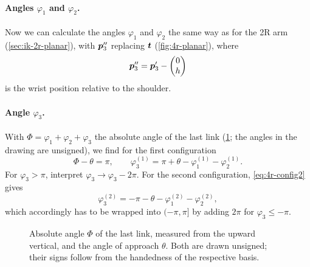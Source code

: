 \paragraph{Angles $\varphi_1$ and $\varphi_2$.}
Now we can calculate the angles $\varphi_1$ and $\varphi_2$ the same way
as for the 2R arm (\cref{sec:ik-2r-planar}), with $\bm{p}_3''$
replacing $\bm{t}$ (\cref{fig:4r-planar}), where
\[
  \bm{p}_3'' = \bm{p}_3' - \begin{pmatrix} 0 \\ h \end{pmatrix}
\]
is the wrist position relative to the shoulder.

\paragraph{Angle $\varphi_3$.}
With $\Phi = \varphi_1 + \varphi_2 + \varphi_3$ the absolute angle of
the last link (\cref{fig:4r-phi3}; the angles in the drawing are
unsigned), we find for the first configuration
\[
  \Phi - \theta = \pi ,
  \qquad
  \varphi_3^{(1)} = \pi + \theta - \varphi_1^{(1)} - \varphi_2^{(1)} .
\]
For $\varphi_3 > \pi$, interpret $\varphi_3 \to \varphi_3 - 2\pi$.
For the second configuration, \eqref{eq:4r-config2} gives
\[
  \varphi_3^{(2)} = -\pi - \theta - \varphi_1^{(2)} - \varphi_2^{(2)} ,
\]
which accordingly has to be wrapped into $(-\pi, \pi]$ by adding $2\pi$
for $\varphi_3 \le -\pi$.

\begin{figure}[tbp]
  \centering
  \caption{Absolute angle $\Phi$ of the last link, measured from the
    upward vertical, and the angle of approach $\theta$. Both are drawn
    unsigned; their signs follow from the handedness of the respective
    basis.}
  \label{fig:4r-phi3}
\end{figure}

